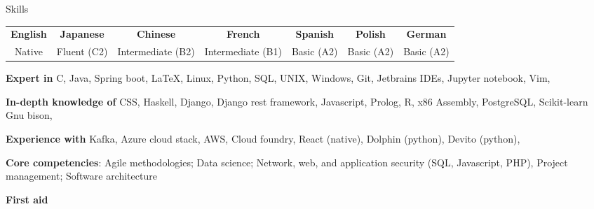 \documentclass[10pt]{resume} %
\begin{document}
\begin{rSection}{Skills}

  \begin{center}
  \begin{tabular}{ c c c c c c c }
   \textbf{English} & \textbf{Japanese} & \textbf{Chinese} & \textbf{French} &
    \textbf{Spanish} & \textbf{Polish} & \textbf{German} \\
    Native & Fluent (C2) & Intermediate (B2) & Intermediate (B1) & Basic (A2) & Basic
    (A2) & Basic (A2)
  \end{tabular}
  \end{center}

  \item \textbf{Expert in}
    C,
    Java,
    Spring boot,
    \LaTeX,
    Linux,
    Python,
    SQL,
    UNIX,
    Windows,
    Git,
    Jetbrains IDEs,
    Jupyter notebook,
    Vim,

  \item \textbf{In-depth knowledge of}
    CSS,
    Haskell,
    Django,
    Django rest framework,
    Javascript,
    Prolog,
    R,
    x86 Assembly,
    PostgreSQL,
    Scikit-learn
    Gnu bison,

  \item \textbf{Experience with}
    Kafka,
    Azure cloud stack,
    AWS,
    Cloud foundry,
    React (native),
    Dolphin (python),
    Devito (python),

  \item \textbf{Core competencies}:
    Agile methodologies;
    Data science;
    Network, web, and application security (SQL, Javascript, PHP),
    Project management;
    Software architecture


  \item \textbf{First aid}

\end{rSection}

\end{document}
